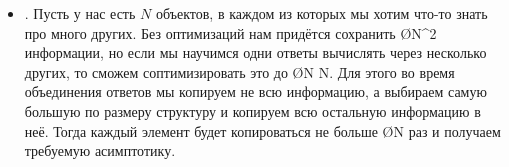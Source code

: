 \begin{itemize}
    \item {}. Пусть у нас есть $N$ объектов, в каждом из которых мы хотим что-то знать про много других. Без оптимизаций нам придётся сохранить \O{N^2} информации, но если мы научимся одни ответы вычислять через несколько других, то сможем соптимизировать это до \O{N \log N}. Для этого во время объединения ответов мы копируем не всю информацию, а выбираем самую большую по размеру структуру и копируем всю остальную информацию в неё. Тогда каждый элемент будет копироваться не больше \O{\log N} раз и получаем требуемую асимптотику.
\end{itemize}
